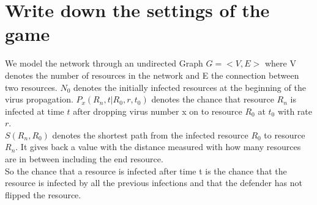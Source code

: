 \documentclass[10pt]{article}
\begin{document}
\section{Write down the settings of the game}

We model the network through an undirected Graph $G = < V, E> $ where V denotes the number of resources in the network and E the connection between two resources. 
$N_{0}$ denotes the initially infected resources at the beginning of the virus propagation. 
$P_{x}(R_{n},t|R_{0},r,t_{0})$ denotes the chance that resource $R_{n}$ is infected at time $t$ after dropping virus number x on to resource $R_{0}$ at $t_{0}$ with rate $r$. \\

$S(R_{n},R_{0})$ denotes the shortest path from the infected resource $R_{0}$ to resource $R_{n}$. It gives back a value with the distance measured with how many resources are in between including the end resource. \\

So the chance that a resource is infected after time t is the chance that the resource is infected by all the previous infections and that the defender has not flipped the resource.
\end{document}
